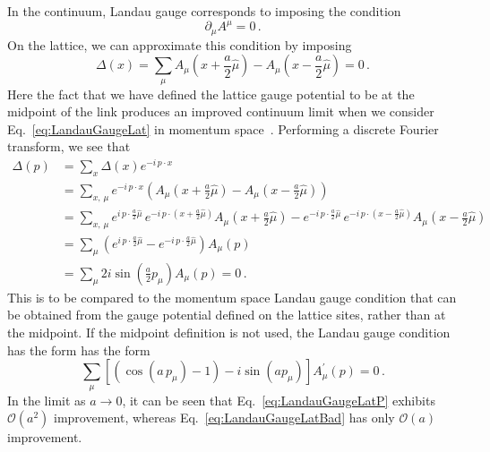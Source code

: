 In the continuum, Landau gauge corresponds to imposing the condition
\begin{equation}
\partial_\mu A^\mu = 0\, .
\label{eq:LandauGaugeCont}
\end{equation}
%
On the lattice, we can approximate this condition by imposing
\begin{equation}
\Delta(x) = \sum _ { \mu } A _ { \mu } \left( x + \frac{a}{2}\hat { \mu } \right) - A _ { \mu } \left( x-\frac{a}{2}\hat { \mu } \right) = 0\, .
\label{eq:LandauGaugeLat}
\end{equation}
Here the fact that we have defined the lattice gauge potential to be at the midpoint of the link produces an improved continuum limit when we consider Eq.~\ref{eq:LandauGaugeLat} in momentum space~\cite{Alles:1996ka}. Performing a discrete Fourier transform, we see that
%
\begin{align}
\Delta(p) &= \sum_x \Delta(x) e^{-i\,p\cdot x} \nonumber\\
&=\sum_{x,\,\mu} e^{-i\,p\cdot x} \left(A _ { \mu } \left( x + \frac{a}{2}\hat { \mu } \right) - A _ { \mu } \left( x-\frac{a}{2}\hat { \mu } \right)\right) \nonumber\\
&= \sum_{x,\,\mu} e^{i\,p\cdot\frac{a}{2}\hat{\mu} }\,e^{-i\,p\cdot\left(x+\frac{a}{2}\hat{\mu} \right)}A _ { \mu } \left( x + \frac{a}{2}\hat { \mu } \right) - e^{-i\,p\cdot\frac{a}{2}\hat{\mu} }\,e^{-i\,p\cdot\left(x-\frac{a}{2}\hat{\mu} \right)}A _ { \mu } \left( x - \frac{a}{2}\hat { \mu } \right) \nonumber\\
&= \sum_\mu \left(e^{i\,p\cdot\frac{a}{2}\hat{\mu} } - e^{-i\,p\cdot\frac{a}{2}\hat{\mu} }\right) A_\mu(p) \nonumber\\
&=\sum_\mu 2i\sin\left(\frac{a}{2} p_\mu\right)A_\mu(p) = 0\, .
\label{eq:LandauGaugeLatP}
\end{align}
%
This is to be compared to the momentum space Landau gauge condition that can be obtained from the gauge potential defined on the lattice sites, rather than at the midpoint. If the midpoint definition is not used, the Landau gauge condition has the form has the form~\cite{Alles:1996ka}
%
\begin{equation}
\sum _ { \mu } \left[ \left( \cos (a\,p _ { \mu }) - 1 \right) - i \sin (ap _ { \mu }) \right] A _ { \mu } ^ { \prime } ( p ) = 0\, .
\label{eq:LandauGaugeLatBad}
\end{equation}
%
In the limit as $a\rightarrow 0$, it can be seen that Eq.~\ref{eq:LandauGaugeLatP} exhibits
$\mathcal{O}(a^2)$ improvement, whereas Eq.~\ref{eq:LandauGaugeLatBad} has only $\mathcal{O}(a)$ improvement.\\

